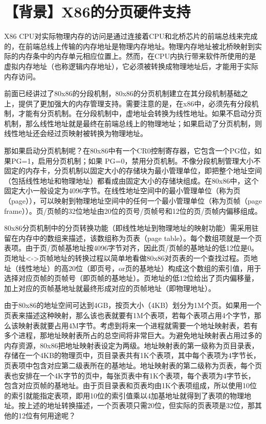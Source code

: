 \section{【背景】X86的分页硬件支持}\label{ux80ccux666fx86ux7684ux5206ux9875ux786cux4ef6ux652fux6301}

X86
CPU对实际物理内存的访问是通过连接着CPU和北桥芯片的前端总线来完成的，在前端总线上传输的内存地址是物理内存地址。物理内存地址被北桥映射到实际的内存条中的内存单元相应位置上。然而，在CPU内执行带来软件所使用的是虚拟内存地址（也称逻辑内存地址），它必须被转换成物理地址后，才能用于实际内存访问。

前面已经讲过了80x86的分段机制，80x86的分页机制建立在其分段机制基础之上，提供了更加强大的内存管理支持。需要注意的是，在x86中，必须先有分段机制，才能有分页机制。在分段机制中，虚地址会转换为线性地址。如果不启动分页机制，那么线性地址就是最终在前端总线上的物理地址；如果启动了分页机制，则线性地址还会经过页映射被转换为物理地址。

那如果启动分页机制呢？在80x86中有一个CR0控制寄存器，它包含一个PG位，如果PG=1，启用分页机制；如果
PG=0，禁用分页机制。不像分段机制管理大小不固定的内存卡，分页机制以固定大小的存储块为最小管理单位，即把整个地址空间（包括线性地址和物理地址）都看成由固定大小的存储块组成。在80x86中，这个固定大小一般设定为4096字节。在线性地址空间中的最小管理单位（称为页（page）），可以映射到物理地址空间中的任何一个最小管理单位（称为页帧（page
frame））。页/页帧的32位地址由20位的页号/页帧号和12位的页/页帧内偏移组成。

80x86分页机制中的分页转换功能（即线性地址到物理地址的映射功能）需采用驻留在内存中的数组来描述，该数组称为页表（page
table）。每个数组项就是一个页表项。由于页/页帧基地址按4096字节对齐，因此页/页帧的基地址的低12位是0。页地址\textless{}-\textgreater{}页帧地址的转换过程以简单地看做80x86对页表的一个查找过程。页地址（线性地址）的高20位（即页号，or页的基地址）构成这个数组的索引值，用于选择对应页帧的页帧号（即页帧的基地址）。页地址的低12位给出了页内偏移量，加上对应的页帧基地址就最终形成对应的页帧地址（即物理地址）。

由于80x86的地址空间可达到4GB，按页大小（4KB）划分为1M个页。如果用一个页表来描述这种映射，那么该也表就要有1M个表项，若每个表项占用4个字节，那么该映射表就要占用4M字节。考虑到将来一个进程就需要一个地址映射表，若有多个进程，那地址映射表所占的总空间将非常巨大。为避免地址映射表占用过多的内存资源，80x86把地址映射表设定为两级。地址映射表的第一级称为页目录表，存储在一个4KB的物理页中，页目录表共有1K个表项，其中每个表项为4字节长，页表项中包含对应第二级表所在的基地址。地址映射表的第二级称为页表，每个页表也安排在一个4K字节的页中，每张页表中有1K个表项，每个表项为4字节长，包含对应页帧的基地址。由于页目录表和页表均由1K个表项组成，所以使用10位的索引就能指定表项，即用10位的索引值乘以4加基地址就得到了表项的物理地址。按上述的地址转换描述，一个页表项只需20位，但实际的页表项是32位，那其他的12位有何用途呢？

